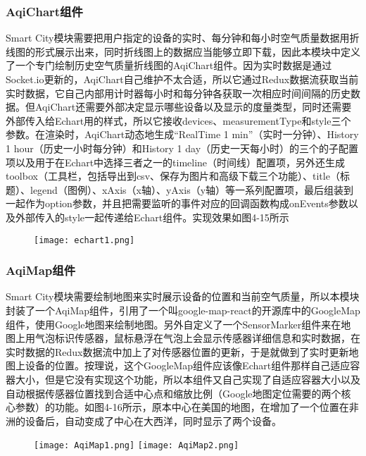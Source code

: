 \subsubsection{AqiChart组件}
Smart City模块需要把用户指定的设备的实时、每分钟和每小时空气质量数据用折线图的形式展示出来，同时折线图上的数据应当能够立即下载，因此本模块中定义了一个专门绘制历史空气质量折线图的AqiChart组件。因为实时数据是通过Socket.io更新的，AqiChart自己维护不太合适，所以它通过Redux数据流获取当前实时数据，它自己内部用计时器每小时和每分钟各获取一次相应时间间隔的历史数据。但AqiChart还需要外部决定显示哪些设备以及显示的度量类型，同时还需要外部传入给Echart用的样式，所以它接收devices、measurementType和style三个参数。在渲染时，AqiChart动态地生成“RealTime 1 min”（实时一分钟）、History 1 hour（历史一小时每分钟）和History 1 day（历史一天每小时）的三个的子配置项以及用于在Echart中选择三者之一的timeline（时间线）配置项，另外还生成toolbox（工具栏，包括导出到csv、保存为图片和高级下载三个功能）、title（标题）、legend（图例）、xAxis（x轴）、yAxis（y轴）等一系列配置项，最后组装到一起作为option参数，并且把需要监听的事件对应的回调函数构成onEvents参数以及外部传入的style一起传递给Echart组件。实现效果如图4-15所示
\begin{figure}[!htp]
 \centering
 \texttt{[image: echart1.png]}
\end{figure}
\subsubsection{AqiMap组件}
Smart City模块需要绘制地图来实时展示设备的位置和当前空气质量，所以本模块封装了一个AqiMap组件，引用了一个叫google-map-react的开源库中的GoogleMap组件，使用Google地图来绘制地图。另外自定义了一个SensorMarker组件来在地图上用气泡标识传感器，鼠标悬浮在气泡上会显示传感器详细信息和实时数据，在实时数据的Redux数据流中加上了对传感器位置的更新，于是就做到了实时更新地图上设备的位置。按理说，这个GoogleMap组件应该像Echart组件那样自己适应容器大小，但是它没有实现这个功能，所以本组件又自己实现了自适应容器大小以及自动根据传感器位置找到合适中心点和缩放比例（Google地图定位需要的两个核心参数）的功能。如图4-16所示，原本中心在美国的地图，在增加了一个位置在非洲的设备后，自动变成了中心在大西洋，同时显示了两个设备。
\begin{figure}[!htp]
 \centering
 \texttt{[image: AqiMap1.png]}
 \texttt{[image: AqiMap2.png]}
\end{figure}

